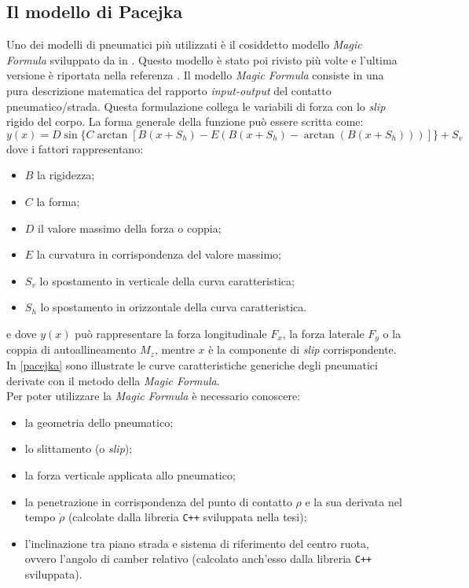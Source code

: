 \subsection{Il modello di Pacejka}
Uno dei modelli di pneumatici più utilizzati è il cosiddetto modello \textit{Magic Formula} sviluppato da \citeauthor{bakker} in \cite{bakker}. Questo modello è stato poi rivisto più volte e l'ultima versione è riportata nella referenza \cite{hans}. Il modello \textit{Magic Formula} consiste in una pura descrizione matematica del rapporto \textit{input-output} del contatto pneumatico/strada. Questa formulazione collega le variabili di forza con lo \textit{slip} rigido del corpo. La forma generale della funzione può essere scritta come:
%
\begin{equation}
y(x) = D\sin\{C\arctan[B(x + S_h ) - E(B(x + S_h ) - \arctan(B(x + S_h )))]\} + S_v
\end{equation}
%
dove i fattori rappresentano:
\begin{itemize}
	\item $B$ la rigidezza;
	\item $C$ la forma;
	\item $D$ il valore massimo della forza o coppia;
	\item $E$ la curvatura in corrispondenza del valore massimo;
	\item $S_v$ lo spostamento in verticale della curva caratteristica;
	\item $S_h$ lo spostamento in orizzontale della curva caratteristica.
\end{itemize}
e dove $y(x)$ può rappresentare la forza longitudinale $F_x$, la forza laterale $F_y$ o la coppia di autoallineamento $M_z$, mentre $x$ è la componente di \textit{slip} corrispondente. In \figurename{ \ref{pacejka}} sono illustrate le curve caratteristiche generiche degli pneumatici derivate con il metodo della \textit{Magic Formula}.\\
Per poter utilizzare la \textit{Magic Formula} è necessario conoscere:
\begin{itemize}
	\item la geometria dello pneumatico;
	\item lo slittamento (o \textit{slip});
	\item la forza verticale applicata allo pneumatico;
	\item la penetrazione in corrispondenza del punto di contatto $\rho$ e la sua derivata nel tempo $\dot{\rho}$ (calcolate dalla libreria \texttt{C++} sviluppata nella tesi);
	\item l'inclinazione tra piano strada e sistema di riferimento del centro ruota, ovvero l'angolo di camber relativo (calcolato anch'esso dalla libreria \texttt{C++} sviluppata).
\end{itemize}
